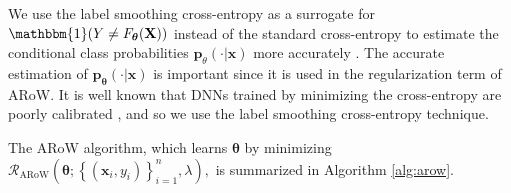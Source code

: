 \documentclass[nohyperref]{article}
\theoremstyle{plain}
\theoremstyle{definition}
\theoremstyle{remark}
\begin{document}
We use the label smoothing cross-entropy as a surrogate for $\mathbbm{1}(Y \neq F_{\bm{\theta}}(\mathbf{X}))$
instead of the standard cross-entropy
to estimate the conditional class probabilities $\mathbf{p}_\theta(\cdot|\bm{x})$ more accurately \citep{muller2019when}.
The accurate estimation of $\mathbf{p}_{\bm{\theta}}(\cdot|\bm{x})$ is important since it is used in the regularization term of ARoW. It is well known that DNNs trained by minimizing the
cross-entropy are poorly calibrated \citep{guo2017on}, and so we use the label smoothing cross-entropy technique.

The ARoW algorithm, which learns $\bm{\theta}$
by minimizing $\mathcal{R}_{\text{ARoW}}(\bm{\theta} ; \left\{(\bm{x}_i, y_i) \right\}_{i=1}^n, \lambda),$ is summarized in Algorithm \ref{alg:arow}.
\end{document}
